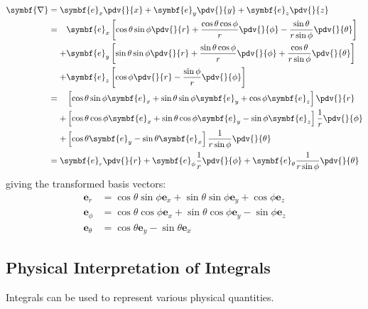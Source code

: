 \documentclass{article}
\begin{document}
\begin{align*}
    \symbf{\nabla} & = \symbf{e}_x \pdv{}{x} + \symbf{e}_y \pdv{}{y} + \symbf{e}_z \pdv{}{z}                                                    \\
                   & =
    \begin{aligned}[t]
          & \symbf{e}_x \left[ \cos{\theta} \sin{\phi} \pdv{}{r} + \frac{\cos{\theta}\cos{\phi}}{r} \pdv{}{\phi} - \frac{\sin{\theta}}{r \sin{\phi}} \pdv{}{\theta} \right] \\
        + & \symbf{e}_y \left[ \sin{\theta} \sin{\phi} \pdv{}{r} + \frac{\sin{\theta}\cos{\phi}}{r} \pdv{}{\phi} + \frac{\cos{\theta}}{r \sin{\phi}} \pdv{}{\theta} \right] \\
        + & \symbf{e}_z \left[ \cos{\phi} \pdv{}{r} - \frac{\sin{\phi}}{r} \pdv{}{\phi} \right]
    \end{aligned}
    \\
                   & =
    \begin{aligned}[t]
          & \left[ \cos{\theta} \sin{\phi} \symbf{e}_x + \sin{\theta} \sin{\phi} \symbf{e}_y + \cos{\phi} \symbf{e}_z \right] \pdv{}{r}              \\
        + & \left[ \cos{\theta}\cos{\phi} \symbf{e}_x + \sin{\theta}\cos{\phi} \symbf{e}_y - \sin{\phi} \symbf{e}_z \right] \frac{1}{r} \pdv{}{\phi} \\
        + & \left[ \cos{\theta} \symbf{e}_y - \sin{\theta} \symbf{e}_x \right] \frac{1}{r \sin{\phi}} \pdv{}{\theta}
    \end{aligned}
    \\
                   & = \symbf{e}_r \pdv{}{r} + \symbf{e}_\phi \frac{1}{r} \pdv{}{\phi} + \symbf{e}_\theta \frac{1}{r \sin{\phi}} \pdv{}{\theta}
\end{align*}
giving the transformed basis vectors:
\begin{align*}
    \symbf{e}_r      & = \cos{\theta} \sin{\phi} \symbf{e}_x + \sin{\theta} \sin{\phi} \symbf{e}_y + \cos{\phi} \symbf{e}_z \\
    \symbf{e}_\phi   & = \cos{\theta}\cos{\phi} \symbf{e}_x + \sin{\theta}\cos{\phi} \symbf{e}_y - \sin{\phi} \symbf{e}_z   \\
    \symbf{e}_\theta & = \cos{\theta} \symbf{e}_y - \sin{\theta} \symbf{e}_x
\end{align*}
\subsection{Physical Interpretation of Integrals}
Integrals can be used to represent various physical quantities.
\end{document}
